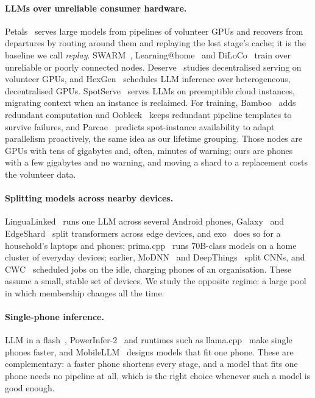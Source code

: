 \documentclass[sigconf,nonacm]{acmart}
\begin{document}
\paragraph{LLMs over unreliable consumer hardware.}
Petals~\cite{petals-acl,petals-neurips} serves large models from pipelines of
volunteer GPUs and recovers from departures by routing around them and
replaying the lost stage's cache; it is the baseline we call \emph{replay}.
SWARM~\cite{swarm}, Learn\-ing\-@home~\cite{learningathome} and
DiLoCo~\cite{diloco} train over unreliable or poorly connected nodes.
Deserve~\cite{deserve} studies decentralised serving on volunteer GPUs, and
HexGen~\cite{hexgen} schedules LLM inference over heterogeneous, decentralised
GPUs. SpotServe~\cite{spotserve} serves LLMs on preemptible cloud instances,
migrating context when an instance is reclaimed. For training,
Bamboo~\cite{bamboo} adds redundant computation and Oobleck~\cite{oobleck}
keeps redundant pipeline templates to survive failures, and
Parcae~\cite{parcae} predicts spot-instance availability to adapt
parallelism proactively, the same idea as our lifetime grouping. Those nodes
are GPUs with tens of gigabytes and, often, minutes of warning; ours are phones
with a few gigabytes and no warning, and moving a shard to a replacement costs
the volunteer data.

\paragraph{Splitting models across nearby devices.}
LinguaLinked~\cite{lingualinked} runs one LLM across several Android phones,
Galaxy~\cite{galaxy} and EdgeShard~\cite{edgeshard} split transformers across
edge devices, and exo~\cite{exo} does so for a household's laptops and phones;
prima.cpp~\cite{primacpp} runs 70B-class models on a home cluster of
everyday devices; earlier, MoDNN~\cite{modnn} and DeepThings~\cite{deepthings}
split CNNs, and CWC~\cite{cwc} scheduled jobs on the idle, charging phones of
an organisation. These
assume a small, stable set of devices. We study the opposite regime: a large
pool in which membership changes all the time.

\paragraph{Single-phone inference.} LLM in a flash~\cite{llminaflash},
PowerInfer-2~\cite{powerinfer2} and runtimes such as llama.cpp~\cite{llamacpp}
make single phones faster, and MobileLLM~\cite{mobilellm} designs models that
fit one phone. These are complementary: a faster phone shortens every stage,
and a model that fits one phone needs no pipeline at all, which is the right
choice whenever such a model is good enough.
\end{document}
